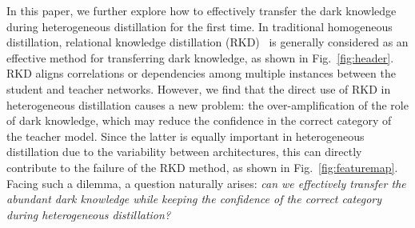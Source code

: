 In this paper, we further explore how to effectively transfer the dark knowledge during heterogeneous distillation for the first time. In traditional homogeneous distillation, relational knowledge distillation (RKD)~\cite{park2019relational} is generally considered as an effective method for transferring dark knowledge, as shown in Fig.~\ref{fig:header}. RKD aligns correlations or dependencies among multiple instances between the student and teacher networks. 
However, we find that the direct use of RKD in heterogeneous distillation causes a new problem: the over-amplification of the role of dark knowledge, which may reduce the confidence in the correct category of the teacher model. Since the latter is equally important in heterogeneous distillation due to the variability between architectures, this can directly contribute to the failure of the RKD method, as shown in Fig.~\ref{fig:featuremap}. Facing such a dilemma, a question naturally arises: \textit{can we effectively transfer the abundant dark knowledge while keeping the confidence of the correct category during heterogeneous distillation?} 

